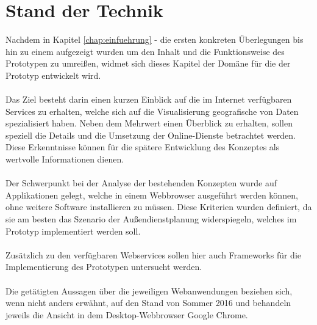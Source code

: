 \documentclass[../Bachelorarbeit.tex]{subfiles}
\begin{document}
\chapter{Stand der Technik}
\label{chap:analyse}

Nachdem in Kapitel \ref{chap:einfuehrung} -  die ersten konkreten Überlegungen bis hin zu einem  aufgezeigt wurden um den Inhalt und die Funktionsweise des Prototypen zu umreißen, widmet sich dieses Kapitel der Domäne für die der Prototyp entwickelt wird.\\
\\
Das Ziel besteht darin einen kurzen Einblick auf die im Internet verfügbaren Services zu erhalten, welche sich auf die Visualisierung geografische von Daten spezialisiert haben. 
Neben dem Mehrwert einen Überblick  zu erhalten, sollen speziell die Details und die Umsetzung der Online-Dienste betrachtet werden.
Diese Erkenntnisse können für die spätere Entwicklung  des Konzeptes als wertvolle Informationen dienen.\\
\\
Der Schwerpunkt bei der Analyse der bestehenden Konzepten wurde auf Applikationen gelegt, welche in einem Webbrowser ausgeführt werden können, ohne weitere Software installieren zu müssen.
Diese Kriterien wurden definiert, da sie am besten das Szenario der Außendienstplanung widerspiegeln, welches im Prototyp implementiert werden soll.\\
\\
Zusätzlich zu den verfügbaren Webservices sollen hier auch Frameworks für die Implementierung des Prototypen untersucht werden. \\
\\
Die getätigten Aussagen über die jeweiligen Webanwendungen beziehen sich, wenn nicht anders erwähnt, auf den Stand von Sommer 2016 und behandeln jeweils die Ansicht in dem Desktop-Webbrowser Google Chrome.
\end{document}
